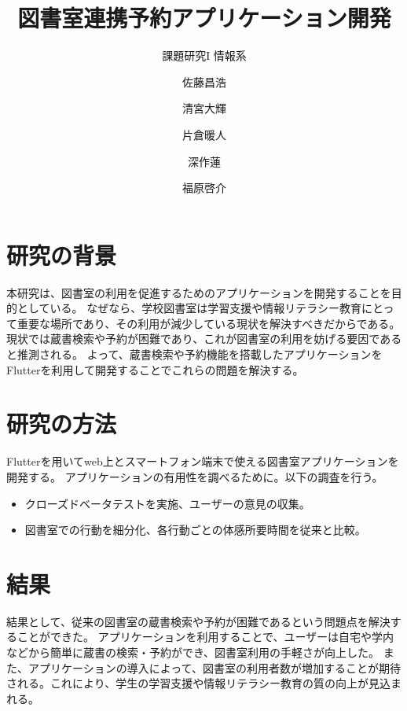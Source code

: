 \documentclass[pdflatex,ja=standard,twocolumn]{bxjsarticle}
\begin{document}
\title{図書室連携予約アプリケーション開発}
\author{課題研究I 情報系\and 佐藤昌浩 \and 清宮大輝 \and 片倉暖人 \and 深作蓮 \and 福原啓介}
\date{\vspace{-10mm}}


\section{研究の背景}
本研究は、図書室の利用を促進するためのアプリケーションを開発することを目的としている。
なぜなら、学校図書室は学習支援や情報リテラシー教育にとって重要な場所であり、その利用が減少している現状を解決すべきだからである。
現状では蔵書検索や予約が困難であり、これが図書室の利用を妨げる要因であると推測される。
よって、蔵書検索や予約機能を搭載したアプリケーションをFlutterを利用して開発することでこれらの問題を解決する。
\section{研究の方法}
Flutterを用いてweb上とスマートフォン端末で使える図書室アプリケーションを開発する。
アプリケーションの有用性を調べるために。以下の調査を行う。
\begin{itemize}
  \item クローズドベータテストを実施、ユーザーの意見の収集。
  \item 図書室での行動を細分化、各行動ごとの体感所要時間を従来と比較。
\end{itemize}
\newpage
\section{結果}
結果として、従来の図書室の蔵書検索や予約が困難であるという問題点を解決することができた。
アプリケーションを利用することで、ユーザーは自宅や学内などから簡単に蔵書の検索・予約ができ、図書室利用の手軽さが向上した。
また、アプリケーションの導入によって、図書室の利用者数が増加することが期待される。これにより、学生の学習支援や情報リテラシー教育の質の向上が見込まれる。
\end{document}
